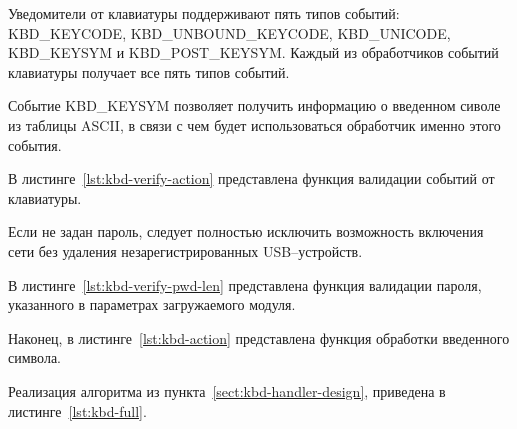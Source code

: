 Уведомители от клавиатуры поддерживают пять типов событий: KBD\_KEYCODE, KBD\_UNBOUND\_KEYCODE, KBD\_UNICODE, KBD\_KEYSYM и KBD\_POST\_KEYSYM. Каждый из обработчиков событий клавиатуры получает все пять типов событий. 

Событие KBD\_KEYSYM позволяет получить информацию о введенном сиволе из таблицы ASCII, в связи с чем будет использоваться обработчик именно этого события.

\clearpage


В листинге~\ref{lst:kbd-verify-action} представлена функция валидации событий от клавиатуры.


Если не задан пароль, следует полностью исключить возможность включения сети без удаления незарегистрированных USB--устройств.

В листинге~\ref{lst:kbd-verify-pwd-len} представлена функция валидации пароля, указанного в параметрах загружаемого модуля.


Наконец, в листинге~\ref{lst:kbd-action} представлена функция обработки введенного символа.


Реализация алгоритма из пункта~\ref{sect:kbd-handler-design}, приведена в листинге~\ref{lst:kbd-full}.

